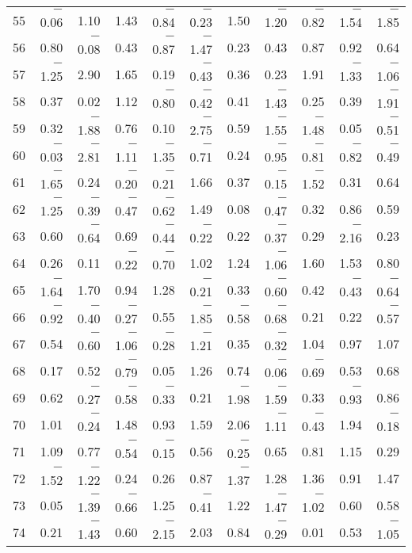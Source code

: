 \documentclass[letterpaper]{article}
\begin{document}
\begin{Schunk}
\begin{longtable}{rrrrrrrrrrr}
  55 & $-$0.06 & 1.10 & 1.43 & $-$0.84 & $-$0.23 & 1.50 & $-$1.20 & $-$0.82 & $-$1.54 & $-$1.85 \\
  56 & 0.80 & $-$0.08 & 0.43 & $-$0.87 & $-$1.47 & 0.23 & 0.43 & 0.87 & 0.92 & 0.64 \\
  57 & $-$1.25 & 2.90 & 1.65 & 0.19 & $-$0.43 & 0.36 & 0.23 & 1.91 & $-$1.33 & $-$1.06 \\
  58 & 0.37 & 0.02 & 1.12 & $-$0.80 & $-$0.42 & 0.41 & $-$1.43 & 0.25 & 0.39 & $-$1.91 \\
  59 & 0.32 & $-$1.88 & 0.76 & 0.10 & $-$2.75 & 0.59 & $-$1.55 & $-$1.48 & 0.05 & $-$0.51 \\
  60 & $-$0.03 & $-$2.81 & $-$1.11 & $-$1.35 & $-$0.71 & 0.24 & $-$0.95 & $-$0.81 & $-$0.82 & $-$0.49 \\
  61 & $-$1.65 & 0.24 & $-$0.20 & $-$0.21 & 1.66 & 0.37 & $-$0.15 & $-$1.52 & 0.31 & 0.64 \\
  62 & $-$1.25 & $-$0.39 & $-$0.47 & $-$0.62 & 1.49 & 0.08 & $-$0.47 & 0.32 & 0.86 & 0.59 \\
  63 & 0.60 & $-$0.64 & 0.69 & $-$0.44 & $-$0.22 & 0.22 & $-$0.37 & 0.29 & $-$2.16 & 0.23 \\
  64 & 0.26 & 0.11 & $-$0.22 & $-$0.70 & 1.02 & 1.24 & $-$1.06 & 1.60 & 1.53 & 0.80 \\
  65 & $-$1.64 & 1.70 & 0.94 & 1.28 & $-$0.21 & 0.33 & $-$0.60 & 0.42 & $-$0.43 & $-$0.64 \\
  66 & $-$0.92 & $-$0.40 & $-$0.27 & 0.55 & $-$1.85 & $-$0.58 & $-$0.68 & 0.21 & 0.22 & $-$0.57 \\
  67 & 0.54 & $-$0.60 & $-$1.06 & $-$0.28 & $-$1.21 & 0.35 & $-$0.32 & 1.04 & 0.97 & 1.07 \\
  68 & 0.17 & 0.52 & $-$0.79 & 0.05 & 1.26 & 0.74 & $-$0.06 & $-$0.69 & 0.53 & 0.68 \\
  69 & 0.62 & $-$0.27 & $-$0.58 & $-$0.33 & 0.21 & $-$1.98 & $-$1.59 & 0.33 & $-$0.93 & 0.86 \\
  70 & 1.01 & $-$0.24 & 1.48 & 0.93 & 1.59 & 2.06 & $-$1.11 & $-$0.43 & 1.94 & $-$0.18 \\
  71 & 1.09 & 0.77 & $-$0.54 & $-$0.15 & 0.56 & $-$0.25 & 0.65 & 0.81 & 1.15 & 0.29 \\
  72 & $-$1.52 & $-$1.22 & 0.24 & 0.26 & 0.87 & $-$1.37 & 1.28 & 1.36 & 0.91 & 1.47 \\
  73 & 0.05 & $-$1.39 & $-$0.66 & 1.25 & $-$0.41 & 1.22 & $-$1.47 & $-$1.02 & 0.60 & 0.58 \\
  74 & 0.21 & $-$1.43 & 0.60 & $-$2.15 & 2.03 & 0.84 & $-$0.29 & 0.01 & 0.53 & $-$1.05 \\

\end{longtable}
\end{Schunk}
\end{document}
